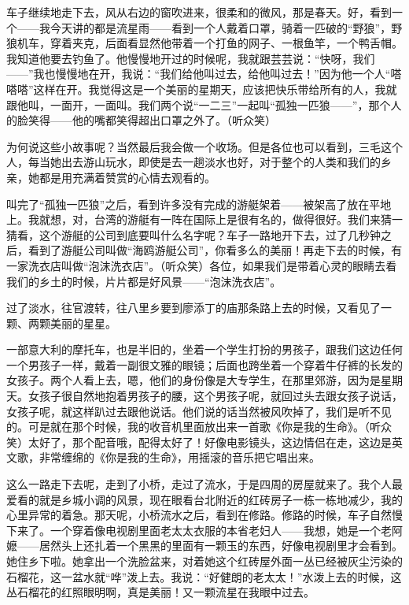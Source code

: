\par 车子继续地走下去，风从右边的窗吹进来，很柔和的微风，那是春天。好，看到一个——我今天讲的都是流星雨——看到一个人戴着口罩，骑着一匹破的“野狼”，野狼机车，穿着夹克，后面看显然他带着一个打鱼的网子、一根鱼竿，一个鸭舌帽。我知道他要去钓鱼了。他慢慢地开过的时候呢，我就跟芸芸说：“快呀，我们——”我也慢慢地在开，我说：“我们给他叫过去，给他叫过去！”因为他一个人“嗒嗒嗒”这样在开。我觉得这是一个美丽的星期天，应该把快乐带给所有的人，我就跟他叫，一面开，一面叫。我们两个说“一二三”一起叫“孤独一匹狼——”，那个人的脸笑得——他的嘴都笑得超出口罩之外了。（听众笑）
\par 为何说这些小故事呢？当然最后我会做一个收场。但是各位也可以看到，三毛这个人，每当她出去游山玩水，即使是去一趟淡水也好，对于整个的人类和我们的乡亲，她都是用充满着赞赏的心情去观看的。
\par 叫完了“孤独一匹狼”之后，看到许多没有完成的游艇架着——被架高了放在平地上。我就想，对，台湾的游艇有一阵在国际上是很有名的，做得很好。我们来猜一猜看，这个游艇的公司到底要叫什么名字呢？车子一路地开下去，过了几秒钟之后，看到了游艇公司叫做“海鸥游艇公司”，你看多么的美丽！再走下去的时候，有一家洗衣店叫做“泡沫洗衣店”。（听众笑）各位，如果我们是带着心灵的眼睛去看我们的乡土的时候，片片都是好风景——“泡沫洗衣店”。
\par 过了淡水，往官渡转，往八里乡要到廖添丁的庙那条路上去的时候，又看见了一颗、两颗美丽的星星。
\par 一部意大利的摩托车，也是半旧的，坐着一个学生打扮的男孩子，跟我们这边任何一个男孩子一样，戴着一副很文雅的眼镜；后面也跨坐着一个穿着牛仔裤的长发的女孩子。两个人看上去，嗯，他们的身份像是大专学生，在那里郊游，因为是星期天。女孩子很自然地抱着男孩子的腰，这个男孩子呢，就回过头去跟女孩子说话，女孩子呢，就这样趴过去跟他说话。他们说的话当然被风吹掉了，我们是听不见的。可是就在那个时候，我的收音机里面放出来一首歌《你是我的生命》。（听众笑）太好了，那个配音哦，配得太好了！好像电影镜头，这边情侣在走，这边是英文歌，非常缠绵的《你是我的生命》，用摇滚的音乐把它唱出来。
\par 这么一路走下去呢，走到了小桥，走过了流水，于是四周的房屋就来了。我个人最爱看的就是乡城小调的风景，现在眼看台北附近的红砖房子一栋一栋地减少，我的心里异常的着急。那天呢，小桥流水之后，看到在修路。修路的时候，车子自然慢下来了。一个穿着像电视剧里面老太太衣服的本省老妇人——我想，她是一个老阿嬷——居然头上还扎着一个黑黑的里面有一颗玉的东西，好像电视剧里才会看到。她住乡下啦。她拿出一个洗脸盆来，对着她这个红砖屋外面一丛已经被灰尘污染的石榴花，这一盆水就“哗”泼上去。我说：“好健朗的老太太！”水泼上去的时候，这丛石榴花的红照眼明啊，真是美丽！又一颗流星在我眼中过去。
